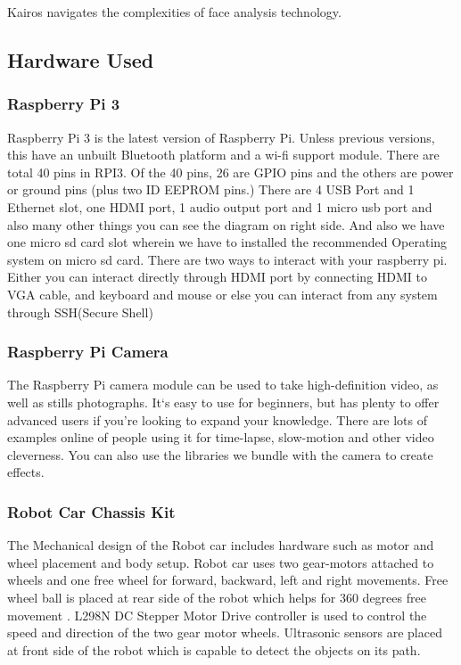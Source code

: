 \documentclass[sigconf]{acmart}
\begin{document}
Kairos navigates the complexities of face analysis technology.

\subsection{Hardware Used}
\subsubsection{Raspberry Pi 3}
Raspberry Pi 3 is the latest version of Raspberry Pi. Unless previous versions, this have an unbuilt Bluetooth platform and a wi-fi support module. There are total 40 pins in RPI3. Of the 40 pins, 26 are GPIO pins and the others are power or ground pins (plus two ID EEPROM pins.) There are 4 USB Port and 1 Ethernet slot, one HDMI port, 1 audio output port and 1 micro usb port and also many other things you can see the diagram on right side. And also we have one micro sd card slot wherein we have to installed the recommended Operating system on micro sd card. There are two ways to interact with your raspberry pi. Either you can interact directly through HDMI port by connecting HDMI to VGA cable, and keyboard and mouse or else you can interact from any system through SSH(Secure Shell) \cite{deligence2017} 

\subsubsection{Raspberry Pi Camera}
The Raspberry Pi camera module can be used to take high-definition video, as well as stills photographs. It`s easy to use for beginners, but has plenty to offer advanced users if you’re looking to expand your knowledge. There are lots of examples online of people using it for time-lapse, slow-motion and other video cleverness. You can also use the libraries we bundle with the camera to create effects.

\subsubsection{Robot Car Chassis Kit}
The Mechanical design of the Robot car includes hardware such as motor and wheel placement and body setup. Robot car uses two gear-motors attached to wheels and one free wheel for forward, backward, left and right movements. Free wheel ball is placed at rear side of the robot which helps for 360 degrees free movement \cite{arduino2015}. L298N DC Stepper Motor Drive controller is used to control the speed and direction of the two gear motor wheels. Ultrasonic sensors are placed at front side of the robot which is capable to detect the objects on its path.
\end{document}
